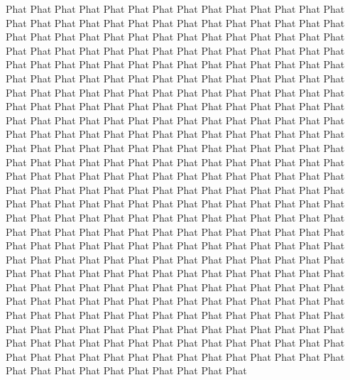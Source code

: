 Phat Phat Phat Phat Phat Phat Phat Phat Phat Phat Phat Phat Phat Phat Phat Phat Phat Phat Phat Phat Phat Phat Phat Phat Phat Phat Phat Phat Phat Phat Phat Phat Phat Phat Phat Phat Phat Phat Phat Phat Phat Phat Phat Phat Phat Phat Phat Phat Phat Phat Phat Phat Phat Phat Phat Phat Phat Phat Phat Phat Phat Phat Phat Phat Phat Phat Phat Phat Phat Phat Phat Phat Phat Phat Phat Phat Phat Phat Phat Phat Phat Phat Phat Phat Phat Phat Phat Phat Phat Phat Phat Phat Phat Phat Phat Phat Phat Phat Phat Phat Phat Phat Phat Phat Phat Phat Phat Phat Phat Phat Phat Phat Phat Phat Phat Phat Phat Phat Phat Phat Phat Phat Phat Phat Phat Phat Phat Phat Phat Phat Phat Phat Phat Phat Phat Phat Phat Phat Phat Phat Phat Phat Phat Phat Phat Phat Phat Phat Phat Phat Phat Phat Phat Phat Phat Phat Phat Phat Phat Phat Phat Phat Phat Phat Phat Phat Phat Phat Phat Phat Phat Phat Phat Phat Phat Phat Phat Phat Phat Phat Phat Phat Phat Phat Phat Phat Phat Phat Phat Phat Phat Phat Phat Phat Phat Phat Phat Phat Phat Phat Phat Phat Phat Phat Phat Phat Phat Phat Phat Phat Phat Phat Phat Phat Phat Phat Phat Phat Phat Phat Phat Phat Phat Phat Phat Phat Phat Phat Phat Phat Phat Phat Phat Phat Phat Phat Phat Phat Phat Phat Phat Phat Phat Phat Phat Phat Phat Phat Phat Phat Phat Phat Phat Phat Phat Phat Phat Phat Phat Phat Phat Phat Phat Phat Phat Phat Phat Phat Phat Phat Phat Phat Phat Phat Phat Phat Phat Phat Phat Phat Phat Phat Phat Phat Phat Phat Phat Phat Phat Phat Phat Phat Phat Phat Phat Phat Phat Phat Phat Phat Phat Phat Phat Phat Phat Phat Phat Phat Phat Phat Phat Phat Phat Phat Phat Phat Phat Phat Phat Phat Phat Phat Phat Phat Phat Phat Phat Phat Phat Phat Phat Phat Phat Phat Phat Phat Phat Phat Phat Phat Phat Phat Phat Phat Phat Phat Phat Phat Phat Phat Phat Phat Phat Phat Phat Phat Phat Phat Phat Phat Phat Phat Phat Phat Phat Phat Phat Phat Phat Phat Phat Phat Phat Phat 
